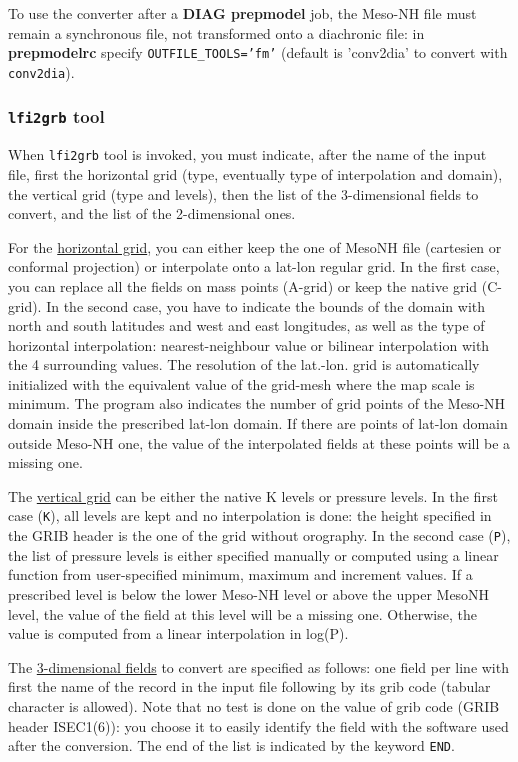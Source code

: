 To use the converter after a {\bf DIAG prepmodel} job, the Meso-NH file must
remain a synchronous file, not transformed onto a diachronic file:
in {\bf prepmodelrc} specify {\tt OUTFILE\_TOOLS='fm'} 
(default is 'conv2dia' to convert with {\tt conv2dia}).


\subsubsection{{\tt lfi2grb} tool}
When {\tt lfi2grb} tool is invoked, you must indicate, 
after the name of the input file, first 
the horizontal grid (type, eventually type of interpolation and domain),
the vertical grid (type and levels), 
then the list of the 3-dimensional fields to convert, 
and the list of the 2-dimensional ones.

For the \underline{horizontal grid}, you can either keep the one of MesoNH file
(cartesien or conformal projection) or interpolate onto a lat-lon regular grid.
In the first case, you can replace all the fields on mass points (A-grid)
or keep the native grid (C-grid).
In the second case, you have to indicate
the bounds of the domain with north and south latitudes and west and east
longitudes, as well as the type of horizontal interpolation:
nearest-neighbour value or bilinear interpolation with the 4 surrounding values.
The resolution of the lat.-lon. grid is automatically initialized 
with the equivalent value of the grid-mesh where the map scale is minimum. 
The program also indicates the number of grid points of the Meso-NH domain 
inside the prescribed lat-lon domain. If there are points of lat-lon domain
outside Meso-NH one, the value of the interpolated fields at these points
will be a missing one.

The \underline{vertical grid} can be either the native K levels or pressure
levels. 
In the first case ({\tt K}), all levels are kept and no interpolation is done:
the height specified in the GRIB header is the one of the grid without orography.
In the second case ({\tt P}), the list of pressure levels is either specified
manually or computed using a linear function from user-specified
minimum, maximum and increment values. If a prescribed level is below the lower
Meso-NH level or above the upper MesoNH level, the value of the field at this 
level will be a missing one. Otherwise, the value is computed from
a linear interpolation in log(P).

The \underline{3-dimensional fields} to convert are specified as follows: 
one field per line with first the name of the record in the input file
following by its grib code (tabular character is allowed). Note that no test
is done on the value of grib code (GRIB header {\sf ISEC1(6)}): you choose it
to easily identify the field with the software used after the conversion.
The end of the list is indicated by the keyword {\tt END}.

